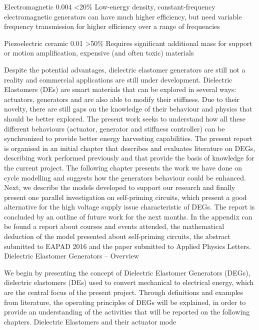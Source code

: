 Electromagnetic	0.004	<20\%	Low-energy density, constant-frequency electromagnetic generators can have much higher efficiency, but need variable frequency transmission for higher efficiency over a range of frequencies

Piezoelectric ceramic	0.01	>50\%	Requires significant additional mass for support or motion amplification, expensive (and often toxic) materials

Despite the potential advantages, dielectric elastomer generators are still not a reality and commercial applications are still under development. Dielectric Elastomers (DEs) are smart materials that can be explored in several ways: actuators, generators and are also able to modify their stiffness. Due to their novelty, there are still gaps on the knowledge of their behaviour and physics that should be better explored.   The present work seeks to understand how all these different behaviours (actuator, generator and stiffness controller) can be synchronized to   provide better energy harvesting capabilities. 
The present report is organised in an initial chapter that describes and evaluates literature on DEGs, describing work performed previously and that provide the basis of knowledge for the current project. The following chapter presents the work we have done on cycle modelling and suggests how the generators behaviour could be enhanced.  Next, we describe the models developed to support our research and finally present one parallel investigation on self-priming circuits, which present a good alternative for the high voltage supply issue characteristic of DEGs. The report is concluded by an outline of future work for the next months.
In the appendix can be found a report about courses and events attended, the mathematical deduction of the model presented about self-priming circuits, the abstract submitted to EAPAD 2016 and the paper submitted to Applied Physics Letters. 
Dielectric Elastomer Generators – Overview

We begin by presenting the concept of Dielectric Elastomer Generators (DEGs), dielectric elastomers (DEs) used to convert mechanical to electrical energy, which are the central focus of the present project. Through definitions and examples from literature, the operating principles of DEGs will be explained, in order to provide an understanding of the activities that will be reported on the following chapters.
Dielectric Elastomers and their actuator mode

